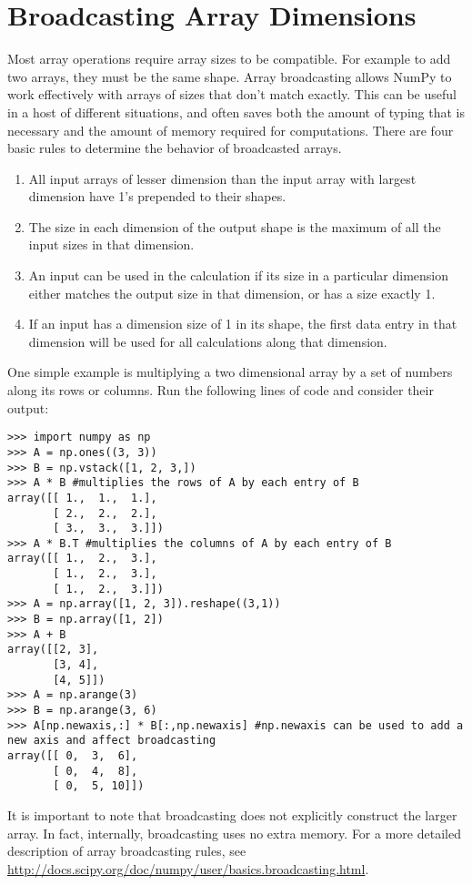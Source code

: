 \label{lab:NumPySciPy}

\section*{Broadcasting Array Dimensions}
Most array operations require array sizes to be compatible.
For example to add two arrays, they must be the same shape.
Array broadcasting allows NumPy to work effectively with arrays of sizes that don't match exactly. 
This can be useful in a host of different situations, and often saves both the 
amount of typing that is necessary and the amount of memory required for computations. 
There are four basic rules to determine the behavior of broadcasted arrays.
\begin{enumerate}
\item All input arrays of lesser dimension than the input array with largest dimension have 1's prepended to their shapes.
\item The size in each dimension of the output shape is the maximum of all the input sizes in that dimension.
\item An input can be used in the calculation if its size in a particular dimension either matches the output size in that dimension, or has a size exactly 1.
\item If an input has a dimension size of 1 in its shape, the first data entry in that dimension will be used for all calculations along that dimension.
\end{enumerate}

One simple example is multiplying a two dimensional array by a set of numbers along its rows or columns.
Run the following lines of code and consider their output:
\begin{lstlisting}
>>> import numpy as np
>>> A = np.ones((3, 3))
>>> B = np.vstack([1, 2, 3,])
>>> A * B #multiplies the rows of A by each entry of B
array([[ 1.,  1.,  1.],
       [ 2.,  2.,  2.],
       [ 3.,  3.,  3.]])
>>> A * B.T #multiplies the columns of A by each entry of B
array([[ 1.,  2.,  3.],
       [ 1.,  2.,  3.],
       [ 1.,  2.,  3.]])
>>> A = np.array([1, 2, 3]).reshape((3,1))
>>> B = np.array([1, 2])
>>> A + B
array([[2, 3],
       [3, 4],
       [4, 5]])
>>> A = np.arange(3)
>>> B = np.arange(3, 6)
>>> A[np.newaxis,:] * B[:,np.newaxis] #np.newaxis can be used to add a new axis and affect broadcasting
array([[ 0,  3,  6],
       [ 0,  4,  8],
       [ 0,  5, 10]])
\end{lstlisting}
It is important to note that broadcasting does not explicitly construct the larger array.
In fact, internally, broadcasting uses no extra memory.
For a more detailed description of array broadcasting rules, see \url{http://docs.scipy.org/doc/numpy/user/basics.broadcasting.html}.

